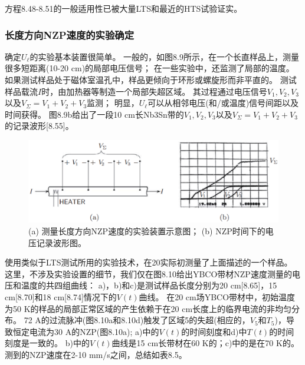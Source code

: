 方程8.48-8.51的一般适用性已被大量LTS和最近的HTS试验证实。

\subsubsection*{长度方向NZP速度的实验确定}
确定$U_\ell$的实验基本装置很简单。
一般的，如图8.9所示，在一个长直样品上，测量很多短距离(10-20 cm)的局部电压信号；
在一些实验中，还监测了局部的温度。
如果测试样品处于磁体室温孔中，样品更倾向于环形或螺旋形而非平直的。
测试样品载流$I$时，由加热器等制造一个局部失超区域。
其过程通过电压信号$V_1,V_2,V_3$以及$V_\Sigma =V_1+V_2+V_3$监测；
明显，$U_\ell$可以从相邻电压(和/或温度)信号间距以及时间获得。
图8.9b给出了一段10 cm长Nb3Sn带的$V_1,V_2,V_3$以及$V_\Sigma =V_1+V_2+V_3$的记录波形[8.55]。

\begin{figure}
	\centering
	\includegraphics[scale=0.5]{chpt8/figs/fig8.9.eps}
	\caption{(a) 测量长度方向NZP速度的实验装置示意图；
		(b) NZP时间下的电压记录波形图。}
\end{figure}

使用类似于LTS测试所用的实验技术，在20实际初测量了上面描述的一个样品。
这里，不涉及实验设置的细节，我们仅在图8.10给出YBCO带材NZP速度测量的电压和温度的共四组曲线：
a)，b)和c)是测试样品长度分别为20 cm[8.65]，15 cm[8.70]和18 cm[8.74]情况下的$V(t)$曲线。
在20 cm场YBCO带材中，初始温度为50 K的样品的局部正常区域的产生依赖于在20 cm长度上的临界电流的非均匀分布。
72 A的过流脉冲(图8.10a和8.10d)触发了区域5的失超(相应的，$V_5$和$T_5$)，导致恒定电流为30 A的NZP(图8.10a);
a)中的$V(t)$的时间刻度和d)中$T(t)$的时间刻度是一致的。
b)中的$V(t)$曲线是15 cm长带材在60 K的；c)中的是在70 K的。
测到的NZP速度在2-10 mm/s之间，总结如表8.5。

